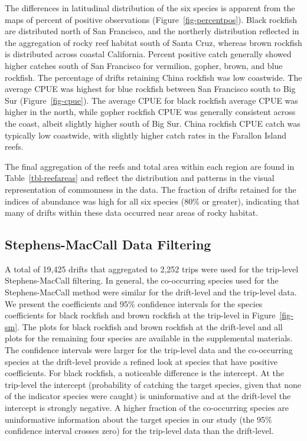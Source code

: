 \documentclass[
  12pt,
  authoryear,
  preprint,
  3p]{elsarticle}
\begin{document}
The differences in latitudinal distribution of the six species is
apparent from the maps of percent of positive observations
(Figure~\ref{fig-percentpos}). Black rockfish are distributed north of
San Francisco, and the northerly distribution reflected in the
aggregation of rocky reef habitat south of Santa Cruz, whereas brown
rockfish is distributed across coastal California. Percent positive
catch generally showed higher catches south of San Francisco for
vermilion, gopher, brown, and blue rockfish. The percentage of drifts
retaining China rockfish was low coastwide. The average CPUE was highest
for blue rockfish between San Francisco south to Big Sur
(Figure~\ref{fig-cpue}). The average CPUE for black rockfish average
CPUE was higher in the north, while gopher rockfish CPUE was generally
consistent across the coast, albeit slightly higher south of Big Sur.
China rockfish CPUE catch was typically low coastwide, with slightly
higher catch rates in the Farallon Island reefs.

The final aggregation of the reefs and total area within each region are
found in Table~\ref{tbl-reefareas} and reflect the distribution and
patterns in the visual representation of commonness in the data. The
fraction of drifts retained for the indices of abundance was high for
all six species (80\% or greater), indicating that many of drifts within
these data occurred near areas of rocky habitat.

\hypertarget{stephens-maccall-data-filtering-1}{%
\subsection{Stephens-MacCall Data
Filtering}\label{stephens-maccall-data-filtering-1}}

A total of 19,425 drifts that aggregated to 2,252 trips were used for
the trip-level Stephens-MacCall filtering. In general, the co-occurring
species used for the Stephens-MacCall method were similar for the
drift-level and the trip-level data. We present the coefficients and
95\% confidence intervals for the species coefficients for black
rockfish and brown rockfish at the trip-level in Figure~\ref{fig-sm}.
The plots for black rockfish and brown rockfish at the drift-level and
all plots for the remaining four species are available in the
supplemental materials. The confidence intervals were larger for the
trip-level data and the co-occurring species at the drift-level provide
a refined look at species that have positive coefficients. For black
rockfish, a noticeable difference is the intercept. At the trip-level
the intercept (probability of catching the target species, given that
none of the indicator species were caught) is uninformative and at the
drift-level the intercept is strongly negative. A higher fraction of the
co-occurring species are uninformative information about the target
species in our study (the 95\% confidence interval crosses zero) for the
trip-level data than the drift-level.
\end{document}
